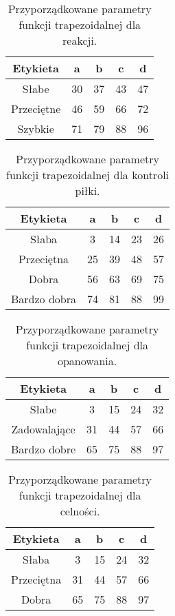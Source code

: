 \documentclass{classrep}
\begin{document}
\begin{table}[H]
	\centering
	\begin{tabular}{c c c c c} 
		\hline
		\textbf{Etykieta} & \textbf{a} & \textbf{b} & \textbf{c} &  \textbf{d} \\ [0.5ex] 
		\hline
		\hline 
		Słabe & 30 & 37 & 43 & 47 \\ 
		Przeciętne & 46 & 59 & 66 & 72 \\
		Szybkie & 71 & 79 & 88 & 96 \\
		\hline
	\end{tabular}
	\caption{Przyporządkowane parametry funkcji trapezoidalnej dla reakcji.}
\end{table}

\begin{table}[H]
	\centering
	\begin{tabular}{c c c c c} 
		\hline
		\textbf{Etykieta} & \textbf{a} & \textbf{b} & \textbf{c} &  \textbf{d} \\ [0.5ex] 
		\hline
		\hline 
		Słaba & 3 & 14 & 23 & 26 \\ 
		Przeciętna & 25 & 39 & 48 & 57 \\
		Dobra & 56 & 63 & 69 & 75 \\
		Bardzo dobra & 74 & 81 & 88 & 99 \\
		\hline
	\end{tabular}
	\caption{Przyporządkowane parametry funkcji trapezoidalnej dla kontroli piłki.}
\end{table}

\begin{table}[H]
	\centering
	\begin{tabular}{c c c c c} 
		\hline
		\textbf{Etykieta} & \textbf{a} & \textbf{b} & \textbf{c} &  \textbf{d} \\ [0.5ex] 
		\hline
		\hline 
		Słabe & 3 & 15 & 24 & 32 \\ 
		Zadowalające & 31 & 44 & 57 & 66 \\
		Bardzo dobre & 65 & 75 & 88 & 97 \\
		\hline
	\end{tabular}
	\caption{Przyporządkowane parametry funkcji trapezoidalnej dla opanowania.}
\end{table}

\begin{table}[H]
	\centering
	\begin{tabular}{c c c c c} 
		\hline
		\textbf{Etykieta} & \textbf{a} & \textbf{b} & \textbf{c} &  \textbf{d} \\ [0.5ex] 
		\hline
		\hline 
		Słaba & 3 & 15 & 24 & 32 \\ 
		Przeciętna & 31 & 44 & 57 & 66 \\
		Dobra & 65 & 75 & 88 & 97 \\
		\hline
	\end{tabular}
	\caption{Przyporządkowane parametry funkcji trapezoidalnej dla celności.}
\end{table}
\end{document}
